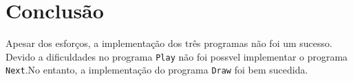 
\chapter*{Conclusão}

Apesar dos esforços, a implementação dos três programas não foi um sucesso. Devido a dificuldades no programa \texttt{Play} não foi possvel implementar o programa  \texttt{Next}.No entanto, a implementação do programa \texttt{Draw} foi bem sucedida. 







